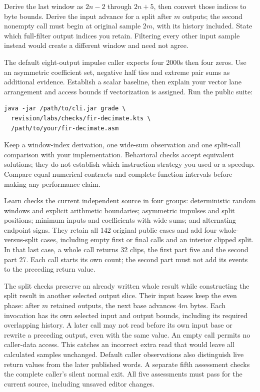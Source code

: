 Derive the last window as $2n-2$ through $2n+5$, then convert those indices to
byte bounds. Derive the input advance for a split after $m$ outputs; the second
nonempty call must begin at original sample $2m$, with its history included.
State which full-filter output indices you retain. Filtering every other input
sample instead would create a different window and need not agree.

The default eight-output impulse caller expects four 2000s then four zeros.
Use an asymmetric coefficient set, negative half ties and extreme pair sums as
additional evidence. Establish a scalar baseline, then explain your vector lane
arrangement and access bounds if vectorization is assigned.
Run the public suite:
\begin{verbatim}
java -jar /path/to/cli.jar grade \
  revision/labs/checks/fir-decimate.kts \
  /path/to/your/fir-decimate.asm
\end{verbatim}
Keep a window-index derivation, one wide-sum observation and one split-call
comparison with your implementation. Behavioral checks accept equivalent
solutions; they do not establish which instruction strategy you used or a speedup.
Compare equal numerical contracts and complete function intervals before making
any performance claim.


Learn checks the current independent source in four groups: deterministic random
windows and explicit arithmetic boundaries; asymmetric impulses and split
positions; minimum inputs and coefficients with wide sums; and alternating
endpoint signs. They retain all 142 original public cases and add four
whole-versus-split cases, including empty first or final calls and an interior
clipped split. In that last case, a whole call returns 32 clips, the first part
five and the second part 27. Each call starts its own count; the second part must
not add its events to the preceding return value.

The split checks preserve an already written whole result while constructing the
split result in another selected output slice. Their input bases keep the even
phase: after $m$ retained outputs, the next base advances $4m$ bytes. Each
invocation has its own selected input and output bounds, including its required
overlapping history. A later call may not read before its own input base or
rewrite a preceding output, even with the same value. An
empty call permits no caller-data access. This catches an incorrect extra read
that would leave all calculated samples unchanged. Default
caller observations also distinguish live return values from the later published
words. A separate fifth assessment checks the complete caller's silent normal
exit. All five assessments must pass for the current source, including unsaved
editor changes.

